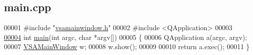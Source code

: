 \hypertarget{main_8cpp_source}{}\subsection{main.\+cpp}
\label{main_8cpp_source}

\begin{DoxyCode}
00001 \textcolor{preprocessor}{#include "\hyperlink{vsamainwindow_8h}{vsamainwindow.h}"}
00002 \textcolor{preprocessor}{#include <QApplication>}
00003 
\hypertarget{main_8cpp_source_l00004}{}\hyperlink{main_8cpp_a0ddf1224851353fc92bfbff6f499fa97}{00004} \textcolor{keywordtype}{int} \hyperlink{main_8cpp_a0ddf1224851353fc92bfbff6f499fa97}{main}(\textcolor{keywordtype}{int} argc, \textcolor{keywordtype}{char} *argv[])
00005 \{
00006   QApplication a(argc, argv);
00007   \hyperlink{class_v_s_a_main_window}{VSAMainWindow} w;
00008   w.show();
00009 
00010   \textcolor{keywordflow}{return} a.exec();
00011 \}
\end{DoxyCode}

